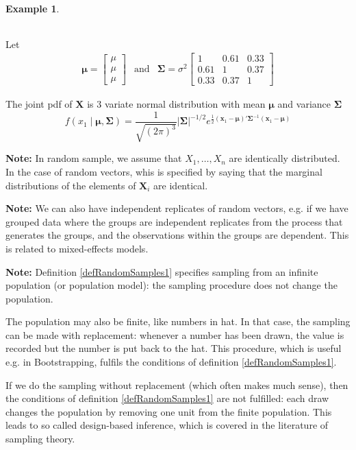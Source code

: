 \documentclass[10pt, twoside, a4paper]{book}
\theoremstyle{definition}
\newtheorem{example}{Example}[chapter]
\begin{document}
\begin{example}
\begin{table}[h]
\begin{tabular}{c|c|c|c}
\end{tabular}
\end{table}
Let
\begin{equation*}
\renewcommand{\arraystretch}{1.6}
\begin{array}{lll}
\bm \mu = \begin{bmatrix} \mu \\ \mu  \\ \mu  \end{bmatrix} &
\text{and} & 
\bm \Sigma = \sigma^2
\begin{bmatrix} 
1 & 0.61 & 0.33 \\ 
0.61 & 1 & 0.37  \\ 
0.33 & 0.37 & 1
\end{bmatrix}
\end{array}
\end{equation*}

The joint pdf of $\bm X$ is 3 variate normal distribution with mean $\bm \mu$
and variance $\bm \Sigma$ 
$$f(x_1 \mid \bm \mu, \bm \Sigma) = \frac{1}{\sqrt{(2\pi)^3}}
\lvert \bm \Sigma \rvert^{-1/2}e^{\frac{1}{2}(\bm x_1 - \bm \mu)'\bm \Sigma^{-1}(\bm x_1 - \bm
\mu)}$$
\end{example}
\textbf{Note:} In random sample, we assume that $X_1,\ldots,X_n$ are identically
distributed. In the case of random vectors, whis is specified by saying that the
marginal distributions of the elements of $\bm X_i$ are identical.

\textbf{Note:} We can also have independent replicates of random vectors, e.g.
if we have grouped data where the groups are independent replicates from the
process that generates the groups, and the observations within the groups are
dependent. This is related to mixed-effects models.

\textbf{Note:} Definition \ref{defRandomSamples1} specifies sampling from an
infinite population (or population model): the sampling procedure does not
change the population.

The population may also be finite, like numbers in hat. In that case, the
sampling can be made with replacement: whenever a number has been drawn, the
value is recorded but the number is put back to the hat. This procedure, which
is useful e.g. in Bootstrapping, fulfils the conditions of definition
\ref{defRandomSamples1}.

If we do the sampling without replacement (which often makes much sense), then
the conditions of definition \ref{defRandomSamples1} are not fulfilled: each
draw changes the population by removing one unit from the finite population.
This leads to so called design-based inference, which is covered in the
literature of sampling theory.
\end{document}
